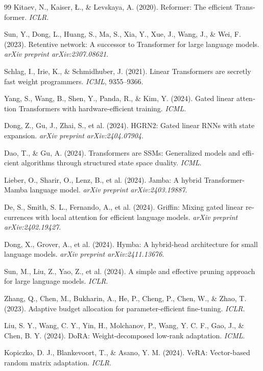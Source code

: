 \documentclass[12pt,a4paper]{report}
\theoremstyle{definition}
\begin{document}
\begin{latin}
\begin{thebibliography}{99}
Kitaev, N., Kaiser, {\L}., \& Levskaya, A. (2020).
Reformer: The efficient Transformer.
\textit{ICLR}.

Sun, Y., Dong, L., Huang, S., Ma, S., Xia, Y., Xue, J., Wang, J., \& Wei, F. (2023).
Retentive network: A successor to Transformer for large language models.
\textit{arXiv preprint arXiv:2307.08621}.

Schlag, I., Irie, K., \& Schmidhuber, J. (2021).
Linear Transformers are secretly fast weight programmers.
\textit{ICML}, 9355--9366.

Yang, S., Wang, B., Shen, Y., Panda, R., \& Kim, Y. (2024).
Gated linear attention Transformers with hardware-efficient training.
\textit{ICML}.

Dong, Z., Gu, J., Zhai, S., et al. (2024).
HGRN2: Gated linear RNNs with state expansion.
\textit{arXiv preprint arXiv:2404.07904}.

Dao, T., \& Gu, A. (2024).
Transformers are SSMs: Generalized models and efficient algorithms through structured state space duality.
\textit{ICML}.

Lieber, O., Sharir, O., Lenz, B., et al. (2024).
Jamba: A hybrid Transformer-Mamba language model.
\textit{arXiv preprint arXiv:2403.19887}.

De, S., Smith, S. L., Fernando, A., et al. (2024).
Griffin: Mixing gated linear recurrences with local attention for efficient language models.
\textit{arXiv preprint arXiv:2402.19427}.

Dong, X., Grover, A., et al. (2024).
Hymba: A hybrid-head architecture for small language models.
\textit{arXiv preprint arXiv:2411.13676}.

Sun, M., Liu, Z., Yao, Z., et al. (2024).
A simple and effective pruning approach for large language models.
\textit{ICLR}.

Zhang, Q., Chen, M., Bukharin, A., He, P., Cheng, P., Chen, W., \& Zhao, T. (2023).
Adaptive budget allocation for parameter-efficient fine-tuning.
\textit{ICLR}.

Liu, S. Y., Wang, C. Y., Yin, H., Molchanov, P., Wang, Y. C. F., Gao, J., \& Chen, B. Y. (2024).
DoRA: Weight-decomposed low-rank adaptation.
\textit{ICML}.

Kopiczko, D. J., Blankevoort, T., \& Asano, Y. M. (2024).
VeRA: Vector-based random matrix adaptation.
\textit{ICLR}.


\end{thebibliography}
\end{latin}
\end{document}
